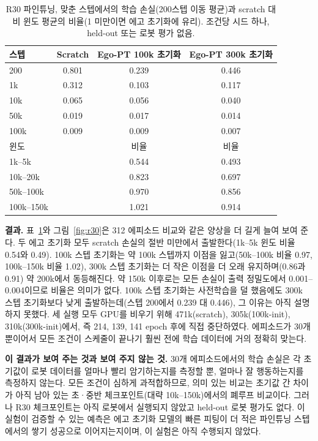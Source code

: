 \documentclass[conference,10pt]{IEEEtran}
\begin{document}
\begin{table}[t]
\centering\footnotesize\setlength{\tabcolsep}{4pt}
\caption{R30 파인튜닝, 맞춘 스텝에서의 학습 손실(200스텝 이동 평균)과 scratch 대비 윈도 평균의 비율(1 미만이면 에고 초기화에 유리).
조건당 시드 하나, held-out 또는 로봇 평가 없음.}
\label{tab:r30}
\begin{tabular}{@{}lccc@{}}
\toprule
스텝 & Scratch & Ego-PT 100k 초기화 & Ego-PT 300k 초기화 \\
\midrule
200 & 0.801 & 0.239 & 0.446 \\
1k & 0.312 & 0.103 & 0.117 \\
10k & 0.065 & 0.056 & 0.040 \\
50k & 0.019 & 0.017 & 0.014 \\
100k & 0.009 & 0.009 & 0.007 \\
\midrule
윈도 & & 비율 & 비율 \\
\midrule
1k--5k & & 0.544 & 0.493 \\
10k--20k & & 0.823 & 0.697 \\
50k--100k & & 0.970 & 0.856 \\
100k--150k & & 1.021 & 0.914 \\
\bottomrule
\end{tabular}
\end{table}

\textbf{결과.} 표~\ref{tab:r30}와 그림~\ref{fig:r30}은 312 에피소드 비교와 같은 양상을 더 길게 늘여 보여 준다. 두 에고 초기화 모두 scratch
손실의 절반 미만에서 출발한다(1k--5k 윈도 비율 0.54와 0.49). 100k 스텝 초기화는 약 100k 스텝까지 이점을 잃고(50k--100k 비율 0.97,
100k--150k 비율 1.02), 300k 스텝 초기화는 더 작은 이점을 더 오래 유지하며(0.86과 0.91) 약 200k에서 동등해진다. 약 150k 이후로는 모든
손실이 출력 정밀도에서 0.001--0.004이므로 비율은 의미가 없다. 100k 스텝 초기화는 사전학습을 덜 했음에도 300k 스텝 초기화보다 낮게
출발하는데(스텝 200에서 0.239 대 0.446), 그 이유는 아직 설명하지 못했다. 세 실행 모두 GPU를 비우기 위해 471k(scratch), 305k(100k-init),
310k(300k-init)에서, 즉 214, 139, 141 epoch 후에 직접 중단하였다. 에피소드가 30개뿐이어서 모든 조건이 스케줄이 끝나기 훨씬 전에 학습
데이터에 거의 정확히 맞는다.

\textbf{이 결과가 보여 주는 것과 보여 주지 않는 것.} 30개 에피소드에서의 학습 손실은 각 초기값이 로봇 데이터를 얼마나 빨리 암기하는지를
측정할 뿐, 얼마나 잘 행동하는지를 측정하지 않는다. 모든 조건이 심하게 과적합하므로, 의미 있는 비교는 초기값 간 차이가 아직 남아 있는
초·중반 체크포인트(대략 10k--150k)에서의 폐루프 비교이다. 그러나 R30 체크포인트는 아직 로봇에서 실행되지 않았고 held-out 로봇 평가도
없다. 이 실험이 검증할 수 있는 예측은 에고 초기화 모델의 빠른 피팅이 더 적은 파인튜닝 스텝에서의 쌓기 성공으로 이어지는지이며, 이 실험은
아직 수행되지 않았다.
\end{document}
